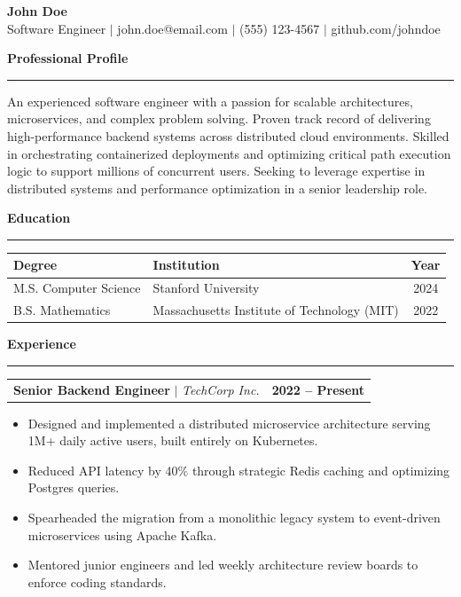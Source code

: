 \documentclass[10pt,a4paper]{article}
\begin{document}
\begin{center}
    {\huge \textbf{John Doe}} \\[2mm]
    Software Engineer $\vert$ john.doe@email.com $\vert$ (555) 123-4567 $\vert$ github.com/johndoe
\end{center}

\vspace{4mm}
\noindent\textbf{\large Professional Profile} \\
\rule{\linewidth}{0.5pt}

An experienced software engineer with a passion for scalable architectures, microservices, and complex problem solving. Proven track record of delivering high-performance backend systems across distributed cloud environments. Skilled in orchestrating containerized deployments and optimizing critical path execution logic to support millions of concurrent users. Seeking to leverage expertise in distributed systems and performance optimization in a senior leadership role.

\vspace{4mm}
\noindent\textbf{\large Education} \\
\rule{\linewidth}{0.5pt}

\begin{center}
\begin{tabular}{llc}
\toprule
\textbf{Degree} & \textbf{Institution} & \textbf{Year} \\
\midrule
M.S. Computer Science & Stanford University & 2024 \\
B.S. Mathematics & Massachusetts Institute of Technology (MIT) & 2022 \\
\bottomrule
\end{tabular}
\end{center}

\vspace{4mm}
\noindent\textbf{\large Experience} \\
\rule{\linewidth}{0.5pt}

\noindent
\begin{tabularx}{\linewidth}{@{}Xr@{}}
\textbf{Senior Backend Engineer} $\vert$ \textit{TechCorp Inc.} & \textbf{2022 -- Present} \\
\end{tabularx}

\begin{itemize}[leftmargin=*,noitemsep]
    \item Designed and implemented a distributed microservice architecture serving 1M+ daily active users, built entirely on Kubernetes.
    \item Reduced API latency by 40\% through strategic Redis caching and optimizing Postgres queries.
    \item Spearheaded the migration from a monolithic legacy system to event-driven microservices using Apache Kafka.
    \item Mentored junior engineers and led weekly architecture review boards to enforce coding standards.
\end{itemize}
\end{document}
